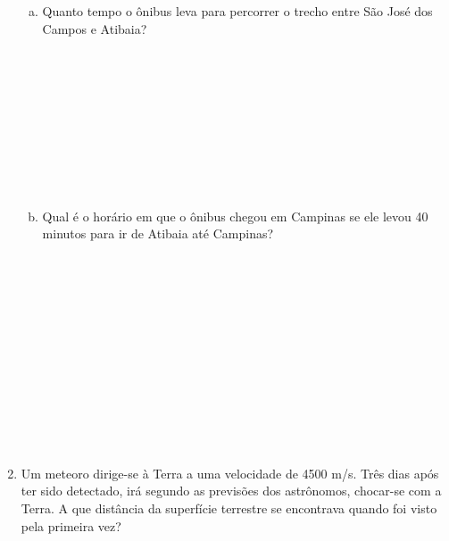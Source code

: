 \documentclass[a4paper,14pt]{article}
\begin{document}
\begin{multicols}{2}
\begin{enumerate}
\begin{enumerate}[a)]
            	\item Quanto tempo o ônibus leva para percorrer o trecho entre São José dos Campos e Atibaia? \\\\\\\\\\\\\\\\\\\\
            	\item Qual é o horário em que o ônibus chegou em Campinas se ele levou 40 minutos para ir de Atibaia até Campinas? \\\\\\\\\\\\\\\\\\\\\\\\\\
            \end{enumerate}
            \item Um meteoro dirige-se à Terra a uma velocidade de 4500 m/s. Três dias após ter sido detectado, irá segundo as previsões dos astrônomos, chocar-se com a Terra. A que distância da superfície terrestre se encontrava quando foi visto pela primeira vez? \\\\\\\\\\\\\\\\\\\\\\\\\\\\\\\\\\\\\\\\\\\\\\\\\\\\\\\\\\\\\\\\

\end{enumerate}
\end{multicols}
\end{document}

